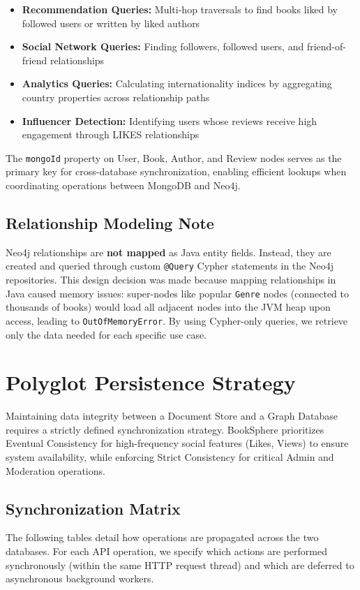 \begin{itemize}
    \item \textbf{Recommendation Queries:} Multi-hop traversals to find books liked by followed users or written by liked authors
    \item \textbf{Social Network Queries:} Finding followers, followed users, and friend-of-friend relationships
    \item \textbf{Analytics Queries:} Calculating internationality indices by aggregating country properties across relationship paths
    \item \textbf{Influencer Detection:} Identifying users whose reviews receive high engagement through LIKES relationships
\end{itemize}

The \texttt{mongoId} property on User, Book, Author, and Review nodes serves as the primary key for cross-database synchronization, enabling efficient lookups when coordinating operations between MongoDB and Neo4j.

\subsection{Relationship Modeling Note}
Neo4j relationships are \textbf{not mapped} as Java entity fields. Instead, they are created and queried through custom \texttt{@Query} Cypher statements in the Neo4j repositories. This design decision was made because mapping relationships in Java caused memory issues: super-nodes like popular \texttt{Genre} nodes (connected to thousands of books) would load all adjacent nodes into the JVM heap upon access, leading to \texttt{OutOfMemoryError}. By using Cypher-only queries, we retrieve only the data needed for each specific use case.

\section{Polyglot Persistence Strategy}
\label{sec:consistency}

Maintaining data integrity between a Document Store and a Graph Database requires a strictly defined synchronization strategy. BookSphere prioritizes Eventual Consistency for high-frequency social features (Likes, Views) to ensure system availability, while enforcing Strict Consistency for critical Admin and Moderation operations.

\subsection{Synchronization Matrix}
The following tables detail how operations are propagated across the two databases. For each API operation, we specify which actions are performed synchronously (within the same HTTP request thread) and which are deferred to asynchronous background workers.

